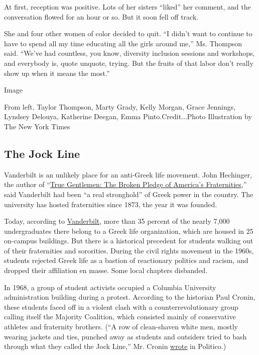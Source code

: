 At first, reception was positive. Lots of her sisters ``liked'' her
comment, and the conversation flowed for an hour or so. But it soon fell
off track.

She and four other women of color decided to quit. ``I didn't want to
continue to have to spend all my time educating all the girls around
me,'' Ms. Thompson said. ``We've had countless, you know, diversity
inclusion sessions and workshops, and everybody is, quote unquote,
trying. But the fruits of that labor don't really show up when it means
the most.''

Image

From left, Taylor Thompson, Marty Grady, Kelly Morgan, Grace Jennings,
Lyndsey Delouya, Katherine Deegan, Emma Pinto.Credit...Photo
Illustration by The New York Times

\hypertarget{the-jock-line}{%
\subsection{The Jock Line}\label{the-jock-line}}

Vanderbilt is an unlikely place for an anti-Greek life movement. John
Hechinger, the author of
``\href{https://www.publicaffairsbooks.com/titles/john-hechinger/true-gentlemen/9781610396837/}{True
Gentlemen: The Broken Pledge of America's Fraternities},'' said
Vanderbilt had been ``a real stronghold'' of Greek power in the country.
The university has hosted fraternities since 1873, the year it was
founded.

Today, according to
\href{https://www.vanderbilt.edu/greek_life/about-us/}{Vanderbilt}, more
than 35 percent of the nearly 7,000 undergraduates there belong to a
Greek life organization, which are housed in 25 on-campus buildings. But
there is a historical precedent for students walking out of their
fraternities and sororities. During the civil rights movement in the
1960s, students rejected Greek life as a bastion of reactionary politics
and racism, and dropped their affiliation en masse. Some local chapters
disbanded.

In 1968, a group of student activists occupied a Columbia University
administration building during a protest. According to the historian
Paul Cronin, these students faced off in a violent clash with a
counterrevolutionary group calling itself the Majority Coalition, which
consisted mainly of conservative athletes and fraternity brothers. (``A
row of clean-shaven white men, mostly wearing jackets and ties, punched
away as students and outsiders tried to bash through what they called
the Jock Line,'' Mr. Cronin
\href{https://www.politico.com/news/magazine/2020/06/07/barr-protesters-columbia-1968-304556}{wrote}
in Politico.)

